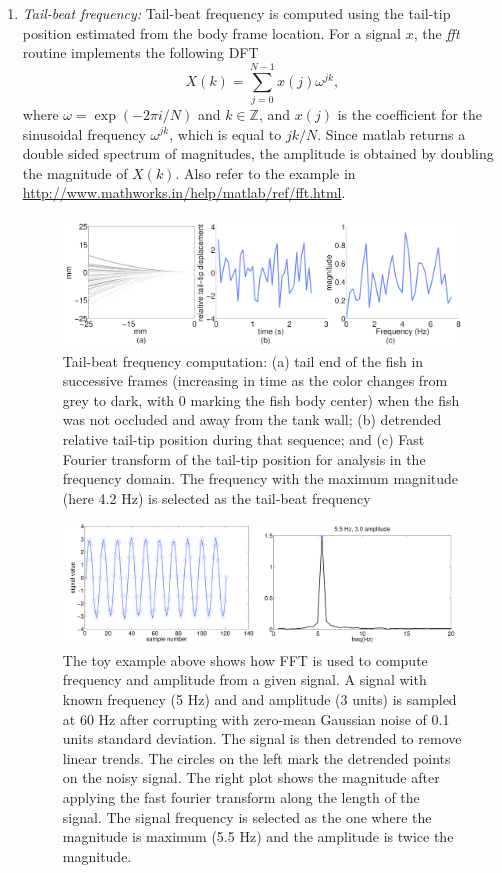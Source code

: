 \documentclass[11pt]{article}
\begin{document}
\begin{enumerate}
\begin{enumerate}
	\end{enumerate}
\item \emph{Tail-beat frequency:} Tail-beat frequency is computed using the tail-tip position estimated from the body frame location. For a signal $x$, the \emph{fft} routine implements the following DFT
\begin{equation}
X(k)=\sum_{j=0}^{N-1}x(j)\omega^{jk},
\end{equation}
where $\omega=\exp(-2\pi i /N)$ and $k \in \mathbb{Z}$, and $x(j)$ is the coefficient for the sinusoidal frequency $\omega^{jk}$, which is equal to $jk/N$. Since matlab returns a double sided spectrum of magnitudes, the amplitude is obtained by doubling the magnitude of $X(k)$. 
Also refer to the example in \url{http://www.mathworks.in/help/matlab/ref/fft.html}.  
\begin{figure}
\centering
\includegraphics[width=.995\linewidth]{tbf_computation}
\caption{Tail-beat frequency computation: (a) tail end of the fish in successive frames (increasing in time as the color changes from grey to dark, with 0 marking the fish body center) when the fish was not occluded and away from the tank wall; (b) detrended relative tail-tip position during that sequence; and (c) Fast Fourier transform of the tail-tip position for analysis in the frequency domain. The frequency with the maximum magnitude (here 4.2 Hz) is selected as the tail-beat frequency}
\label{fig:tbf_computation}
\end{figure}	

\begin{figure}
\centering
\includegraphics[width=.995\linewidth]{fft_example}
\caption{The toy example above shows how FFT is used to compute frequency and amplitude from a given signal. A signal with known frequency (5 Hz) and and amplitude (3 units) is sampled at 60 Hz after corrupting with zero-mean Gaussian noise of 0.1 units standard deviation. The signal is then detrended to remove linear trends. The circles on the left mark the detrended points on the noisy signal. The right plot shows the magnitude after applying the fast fourier transform along the length of the signal. The signal frequency is selected as the one where the magnitude is maximum (5.5 Hz) and the amplitude is twice the magnitude.}
\label{fig:fft_example}
\end{figure}	



\end{enumerate}
\end{document}
